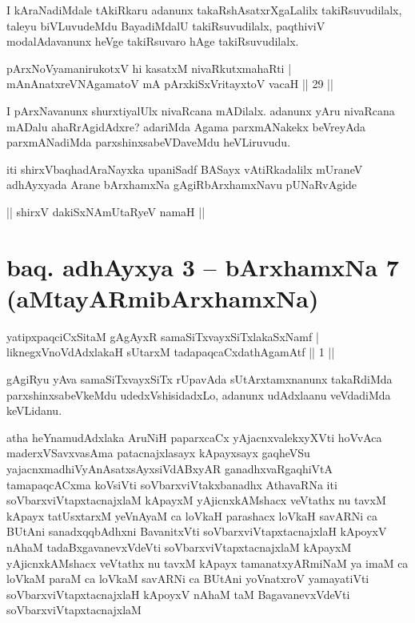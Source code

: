 \begin{artha}%
I kAraNadiMdale tAkiRkaru adanunx takaRshAsatxrXgaLalilx takiRsuvudilalx, taleyu biVLuvudeMdu BayadiMdalU takiRsuvudilalx, paqthiviV modalAdavanunx heVge takiRsuvaro hAge takiRsuvudilalx.
\end{artha}

\begin{shl}
pArxNoV\s yamanirukotxV hi kasatxM nivaRkutxmahaRti |\\
mAnAnatxreVNA\s \s gamatoV mA pArxkiSxVritayxtoV vacaH \hfill || 29 ||
\end{shl}

\begin{artha}
I pArxNavanunx shurxtiyalUlx nivaRcana mADilalx. adanunx yAru nivaRcana mADalu ahaRrAgidAdxre? adariMda Agama parxmANakekx beVreyAda parxmANadiMda parxshinxsabeVDaveMdu heVLiruvudu.
\end{artha}

\begin{center}
iti shirxVbaqhadAraNayxka upaniSadf BASayx vAtiRkadalilx mUraneV adhAyxyada Arane bArxhamxNa gAgiRbArxhamxNavu pUNaRvAgide
\end{center}

\begin{center}%
|| shirxV dakiSxNAmUtaRyeV namaH ||
\end{center}

\section*{baq. adhAyxya 3 -- bArxhamxNa 7 (aMtayARmibArxhamxNa)}

\begin{shl}
yatipxpaqciCxSitaM gAgAyxR samaSiTxvayxSiTxlakaSxNamf |\\
liknegxVnoVdAdxlakaH sUtarxM tadapaqcaCxdathA\s \s gamAtf \hfill || 1 ||
\end{shl}

\begin{artha}
gAgiRyu yAva samaSiTxvayxSiTx rUpavAda sUtArxtamxnanunx takaRdiMda parxshinxsabeVkeMdu udedxVshisidadxLo, adanunx udAdxlaanu veVdadiMda keVLidanu.
\end{artha}

\begin{shl}
atha heYnamudAdxlaka AruNiH paparxcaCx yAjacnxvalekxyXVti hoVvAca maderxVSavxvasAma patacnajxlasayx kApayxsayx gaqheVSu yajacnxmadhiVyAnAsatxsAyxsiVdABxyAR ganadhxvaRgaqhiVtA tamapaqcACxma koV\s siVti soV\s barxviVtakxbanadhx AthavaRNa iti soV\s barxviVtapxtacnajxlaM kApayxM yAjicnxkAMshacx veVtathx nu tavxM kApayx tatUsxtarxM yeVnAyaM ca loVkaH parashacx loVkaH savARNi ca BUtAni sanadxqqbAdhxni BavanitxVti soV\s barxviVtapxtacnajxlaH kApoyxV nAhaM tadaBxgavanevxVdeVti soV\s barxviVtapxtacnajxlaM kApayxM yAjicnxkAMshacx veVtathx nu tavxM kApayx tamanatxyARmiNaM ya imaM ca loVkaM paraM ca 
loVkaM savARNi ca BUtAni yoV\s natxroV yamayatiVti soV\s barxviVtapxtacnajxlaH kApoyxV nAhaM taM BagavanevxVdeVti soV\s barxviVtapxtacnajxlaM 
\end{shl}


